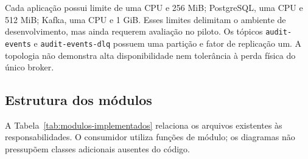 Cada aplicação possui limite de uma CPU e 256 MiB; PostgreSQL, uma CPU e 512 MiB; Kafka, uma CPU e 1 GiB. Esses limites delimitam o ambiente de desenvolvimento, mas ainda requerem avaliação no piloto. Os tópicos \texttt{audit-events} e \texttt{audit-events-dlq} possuem uma partição e fator de replicação um. A topologia não demonstra alta disponibilidade nem tolerância à perda física do único broker.

\subsection{Estrutura dos módulos}
A Tabela~\ref{tab:modulos-implementados} relaciona os arquivos existentes às responsabilidades. O consumidor utiliza funções de módulo; os diagramas não pressupõem classes adicionais ausentes do código.

